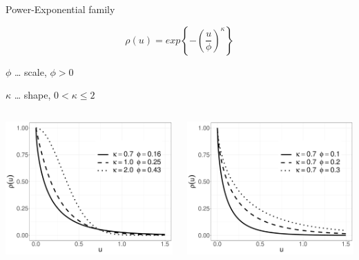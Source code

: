 \documentclass[
  ignorenonframetext,
]{beamer}
\begin{document}
\begin{frame}{Power-Exponential family}
\large

\[\rho(u)=exp\left\{-\left(\frac{u}{\phi}\right)^\kappa\right\}\]

\small

\(\phi\) \ldots{} scale, \(\phi>0\)

\(\kappa\) \ldots{} shape, \(0<\kappa\le 2\)

\begin{columns}[T]
\begin{column}{0.5\textwidth}
\includegraphics{Lecture_1_files/figure-beamer/unnamed-chunk-9-1.pdf}
\end{column}

\begin{column}{0.5\textwidth}
\includegraphics{Lecture_1_files/figure-beamer/unnamed-chunk-10-1.pdf}
\end{column}
\end{columns}
\end{frame}
\end{document}
